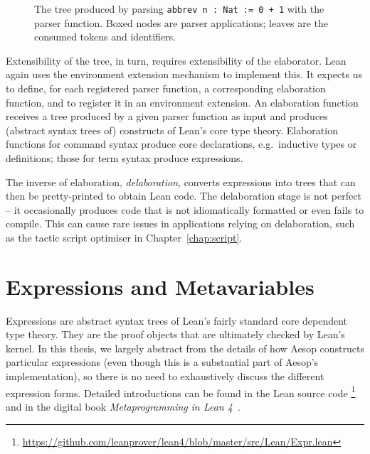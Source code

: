 \begin{figure}
  \centering
  \caption{The  tree produced by parsing \texttt{abbrev n : Nat := 0 + 1} with the  parser function. Boxed nodes are parser applications; leaves are the consumed tokens and identifiers.}%
  \label{fig:background:parse-tree}
\end{figure}

Extensibility of the  tree, in turn, requires extensibility of the elaborator.
Lean again uses the environment extension mechanism to implement this.
It expects us to define, for each registered parser function, a corresponding elaboration function, and to register it in an environment extension.
An elaboration function receives a  tree produced by a given parser function as input and produces (abstract syntax trees of) constructs of Lean's core type theory.
Elaboration functions for command syntax produce core declarations, e.g.\ inductive types or definitions; those for term syntax produce expressions.

The inverse of elaboration, \emph{delaboration}, converts expressions into  trees that can then be pretty-printed to obtain Lean code.
The delaboration stage is not perfect -- it occasionally produces code that is not idiomatically formatted or even fails to compile.
This can cause rare issues in applications relying on delaboration, such as the tactic script optimiser in Chapter~\ref{chap:script}.

\section{Expressions and Metavariables}

Expressions are abstract syntax trees of Lean's fairly standard core dependent type theory.
They are the proof objects that are ultimately checked by Lean's kernel.
In this thesis, we largely abstract from the details of how Aesop constructs particular expressions (even though this is a substantial part of Aesop's implementation), so there is no need to exhaustively discuss the different expression forms.
Detailed introductions can be found in the Lean source code%
\footnote{\url{https://github.com/leanprover/lean4/blob/master/src/Lean/Expr.lean}} and in the digital book \emph{Metaprogramming in Lean 4}~\cite{MetaBook}.

